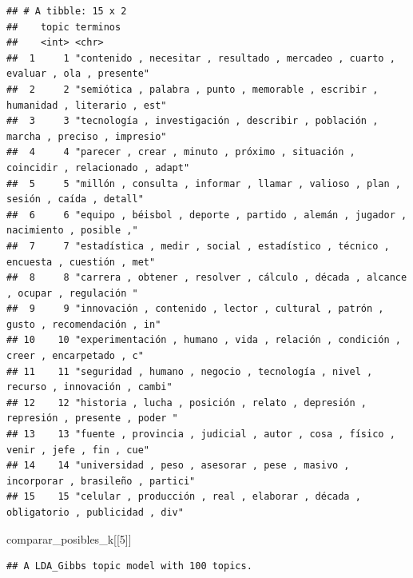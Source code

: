 \documentclass[
]{book}
\newenvironment{Shaded}{\begin{snugshade}}{\end{snugshade}}
\newcommand{\DecValTok}[1]{\textcolor[rgb]{0.00,0.00,0.81}{#1}}
\newcommand{\NormalTok}[1]{#1}
\begin{document}
\begin{verbatim}
## # A tibble: 15 x 2
##    topic terminos                                                                          
##    <int> <chr>                                                                             
##  1     1 "contenido , necesitar , resultado , mercadeo , cuarto , evaluar , ola , presente"
##  2     2 "semiótica , palabra , punto , memorable , escribir , humanidad , literario , est"
##  3     3 "tecnología , investigación , describir , población , marcha , preciso , impresio"
##  4     4 "parecer , crear , minuto , próximo , situación , coincidir , relacionado , adapt"
##  5     5 "millón , consulta , informar , llamar , valioso , plan , sesión , caída , detall"
##  6     6 "equipo , béisbol , deporte , partido , alemán , jugador , nacimiento , posible ,"
##  7     7 "estadística , medir , social , estadístico , técnico , encuesta , cuestión , met"
##  8     8 "carrera , obtener , resolver , cálculo , década , alcance , ocupar , regulación "
##  9     9 "innovación , contenido , lector , cultural , patrón , gusto , recomendación , in"
## 10    10 "experimentación , humano , vida , relación , condición , creer , encarpetado , c"
## 11    11 "seguridad , humano , negocio , tecnología , nivel , recurso , innovación , cambi"
## 12    12 "historia , lucha , posición , relato , depresión , represión , presente , poder "
## 13    13 "fuente , provincia , judicial , autor , cosa , físico , venir , jefe , fin , cue"
## 14    14 "universidad , peso , asesorar , pese , masivo , incorporar , brasileño , partici"
## 15    15 "celular , producción , real , elaborar , década , obligatorio , publicidad , div"
\end{verbatim}

\begin{Shaded}
\begin{Highlighting}[]
\NormalTok{comparar\_posibles\_k[[}\DecValTok{5}\NormalTok{]]}
\end{Highlighting}
\end{Shaded}

\begin{verbatim}
## A LDA_Gibbs topic model with 100 topics.
\end{verbatim}
\end{document}
